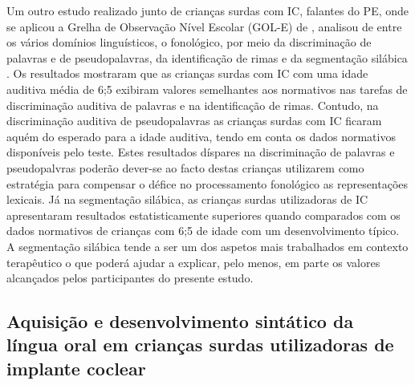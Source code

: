 \documentclass[output=paper,colorlinks,citecolor=brown,booklanguage=portuguese]{langscibook}
\begin{document}
Um outro estudo realizado junto de crianças surdas com IC, falantes do PE, onde se aplicou a Grelha de Observação Nível Escolar (GOL-E)  de \citet{SuaKay2003}, analisou de entre os vários domínios linguísticos, o fonológico, por meio da discriminação de palavras e de pseudopalavras, da identificação de rimas e da segmentação silábica \citep{Ramos2015}. Os resultados mostraram que as crianças surdas com IC com uma idade auditiva média de 6;5 exibiram valores semelhantes aos normativos nas tarefas de discriminação auditiva de palavras e na identificação de rimas. Contudo, na discriminação auditiva de pseudopalavras as crianças surdas com IC ficaram aquém do esperado para a idade auditiva, tendo em conta os dados normativos disponíveis pelo teste. Estes resultados díspares na discriminação de palavras e pseudopalvras poderão dever-se ao facto destas crianças utilizarem como estratégia para compensar o défice no processamento fonológico as representações lexicais. Já na segmentação silábica, as crianças surdas utilizadoras de IC apresentaram resultados estatisticamente superiores quando comparados com os dados normativos de crianças com 6;5 de idade com um desenvolvimento típico.  A segmentação silábica tende a ser um dos aspetos mais trabalhados em contexto terapêutico o que poderá ajudar a explicar, pelo menos, em parte os valores alcançados pelos participantes do presente estudo.

\subsection{Aquisição e desenvolvimento sintático da língua oral em crianças surdas utilizadoras de implante coclear}
\end{document}
